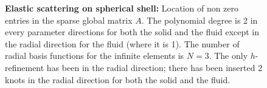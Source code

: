\begin{figure}
	\caption[Global matrix for elastic scattering on spherical shell]{\textbf{Elastic scattering on spherical shell:} Location of non zero entries in the sparse global matrix $A$. The polynomial degree is 2 in every parameter directions for both the solid and the fluid except in the radial direction for the fluid (where it is 1). The number of radial basis functions for the infinite elements is $N=3$. The only $h$-refinement has been in the radial direction; there has been inserted 2 knots in the radial direction for both the solid and the fluid.}
	\label{Fig2:spyA}
\end{figure}

